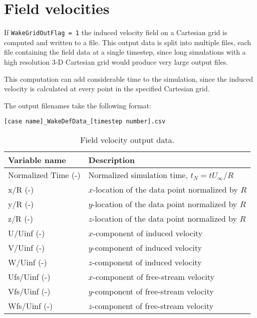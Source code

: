 \section{Field velocities}
If \texttt{WakeGridOutFlag = 1} the induced velocity field on a Cartesian grid is computed and written to a file. This output data is split into multiple files, each file containing the field data at a single timestep, since long simulations with a high resolution 3-D Cartesian grid would produce very large output files.

This computation can add considerable time to the simulation, since the induced velocity is calculated at every point in the specified Cartesian grid.

The output filenames take the following format:

\begin{lstlisting}
[case name]_WakeDefData_[timestep number].csv
\end{lstlisting}

\begin{table}[!htbp]
\centering
\caption{Field velocity output data.}
\label{tbl:output_cartesian_velocity}
\begin{tabular}{p{}p{}}
\toprule
Variable name & Description \\ \midrule
Normalized Time (-) & Normalized simulation time, $t_N=t U_\infty/R$ \\
x/R (-)             & $x$-location of the data point normalized by $R$ \\
y/R (-)             & $y$-location of the data point normalized by $R$ \\
z/R (-)             & $z$-location of the data point normalized by $R$ \\
U/Uinf (-)          & $x$-component of induced velocity              \\
V/Uinf (-)          & $y$-component of induced velocity              \\
W/Uinf (-)          & $z$-component of induced velocity              \\
Ufs/Uinf (-)        & $x$-component of free-stream velocity          \\
Vfs/Uinf (-)        & $y$-component of free-stream velocity          \\
Wfs/Uinf (-)        & $z$-component of free-stream velocity          \\
\bottomrule
\end{tabular}
\end{table}

